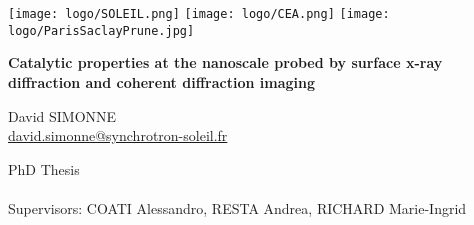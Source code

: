 \begin{titlepage}
\texttt{[image: logo/SOLEIL.png]}
\hspace{2.7cm}
\texttt{[image: logo/CEA.png]}
\hspace{2.7cm}
\texttt{[image: logo/ParisSaclayPrune.jpg]}

\vspace{1.1cm}
    \begin{center}
        \vspace*{1cm}
        
        {\begin{spacing}{1.0}
        \LARGE \textbf{Catalytic properties at the nanoscale probed by surface x-ray diffraction and coherent diffraction imaging}
        \end{spacing}}
        
        \vspace{1.1cm}
        David SIMONNE\\
        \url{david.simonne@synchrotron-soleil.fr}
                
        \vspace{1.0cm}
    \end{center}


\vfill
\textcolor[rgb]{0.5,0.5,0.5}{
    \begin{flushleft}
    { \footnotesize
    PhD Thesis\\
    \thedate\\
    Supervisors: COATI Alessandro, RESTA Andrea, RICHARD Marie-Ingrid\\
    }
    \end{flushleft}
}
      
\end{titlepage}